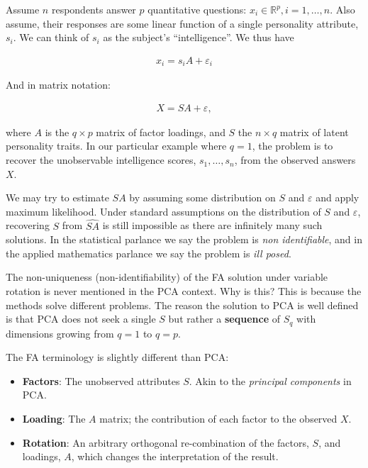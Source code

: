 \documentclass[]{book}
\theoremstyle{definition}
\theoremstyle{definition}
\theoremstyle{definition}
\theoremstyle{remark}
\let\BeginKnitrBlock\begin \let\EndKnitrBlock\end
\begin{document}
\BeginKnitrBlock{example}
\protect\hypertarget{exm:unnamed-chunk-250}{}{\label{exm:unnamed-chunk-250}
}Assume \(n\) respondents answer \(p\) quantitative questions:
\(x_i \in \mathbb{R}^p, i=1,\dots,n\). Also assume, their responses are
some linear function of a single personality attribute, \(s_i\). We can
think of \(s_i\) as the subject's ``intelligence''. We thus have

\begin{align}
    x_i = s_i A  + \varepsilon_i
\end{align}

And in matrix notation:

\begin{align}
    X = S A+\varepsilon,
    \label{eq:factor}
\end{align}

where \(A\) is the \(q \times p\) matrix of factor loadings, and \(S\)
the \(n \times q\) matrix of latent personality traits. In our
particular example where \(q=1\), the problem is to recover the
unobservable intelligence scores, \(s_1,\dots,s_n\), from the observed
answers \(X\).
\EndKnitrBlock{example}

We may try to estimate \(S A\) by assuming some distribution on \(S\)
and \(\varepsilon\) and apply maximum likelihood. Under standard
assumptions on the distribution of \(S\) and \(\varepsilon\), recovering
\(S\) from \(\widehat{S A }\) is still impossible as there are
infinitely many such solutions. In the statistical parlance we say the
problem is \emph{non identifiable}, and in the applied mathematics
parlance we say the problem is \emph{ill posed}.

\BeginKnitrBlock{remark}
{}The non-uniqueness (non-identifiability) of
the FA solution under variable rotation is never mentioned in the PCA
context. Why is this? This is because the methods solve different
problems. The reason the solution to PCA is well defined is that PCA
does not seek a single \(S\) but rather a \textbf{sequence} of \(S_q\)
with dimensions growing from \(q=1\) to \(q=p\).
\EndKnitrBlock{remark}

The FA terminology is slightly different than PCA:

\begin{itemize}
\item
  \textbf{Factors}: The unobserved attributes \(S\). Akin to the
  \emph{principal components} in PCA.
\item
  \textbf{Loading}: The \(A\) matrix; the contribution of each factor to
  the observed \(X\).
\item
  \textbf{Rotation}: An arbitrary orthogonal re-combination of the
  factors, \(S\), and loadings, \(A\), which changes the interpretation
  of the result.
\end{itemize}
\end{document}
